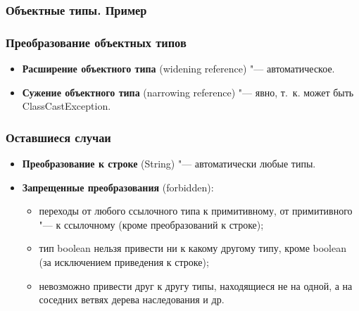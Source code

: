 \documentclass[default]{beamer}
\begin{document}
	\begin{frame}
		\frametitle{Объектные типы. Пример}
		
		\lstCastingObjEx
	\end{frame}			

	\begin{frame}
		\frametitle{Преобразование объектных типов}
		
		\begin{itemize}
			\item \textbf{Расширение объектного типа} (widening reference) "--- автоматическое.
			\item \textbf{Сужение объектного типа} (narrowing reference) "--- явно, т.~к. может быть ClassCastException.
		\end{itemize}
		
		\lstCastingObj
	\end{frame}

	\begin{frame}
	\frametitle{Оставшиеся случаи}
	
		\begin{itemize}
			\item \textbf{Преобразование к строке} (String) "--- автоматически любые типы.
			\item \textbf{Запрещенные преобразования} (forbidden):
			\begin{itemize}
				\item переходы от любого ссылочного типа к примитивному, от примитивного "--- к ссылочному (кроме преобразований к строке);
				\item тип boolean нельзя привести ни к какому другому типу, кроме boolean (за исключением приведения к строке);
				\item невозможно привести друг к другу типы, находящиеся не на одной, а на соседних ветвях дерева наследования и др.
			\end{itemize}
		\end{itemize}
	\end{frame}	
	
\end{document}
